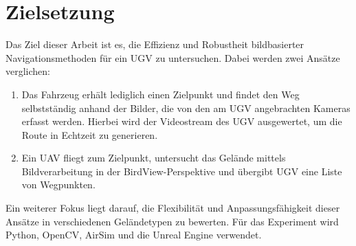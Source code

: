 \section{Zielsetzung}

Das Ziel dieser Arbeit ist es, die Effizienz und Robustheit bildbasierter Navigationsmethoden für ein \ac{UGV} zu untersuchen. 
Dabei werden zwei Ansätze verglichen:

\begin{enumerate}
    \item 
    Das Fahrzeug erhält lediglich einen Zielpunkt und findet den Weg selbstständig anhand der Bilder, die von den am \ac{UGV} angebrachten Kameras erfasst werden. 
    Hierbei wird der Videostream des \ac{UGV} ausgewertet, um die Route in Echtzeit zu generieren. 
    \item 
    Ein \ac{UAV} fliegt zum Zielpunkt, untersucht das Gelände mittels Bildverarbeitung in der \gls{BirdView}-Perspektive und übergibt \ac{UGV} eine Liste von Wegpunkten. 
\end{enumerate}

Ein weiterer Fokus liegt darauf, die Flexibilität und Anpassungsfähigkeit dieser Ansätze in verschiedenen Geländetypen zu bewerten. 
Für das Experiment wird Python, \gls{OpenCV}, \gls{AirSim} und die \gls{Unreal Engine} verwendet.
